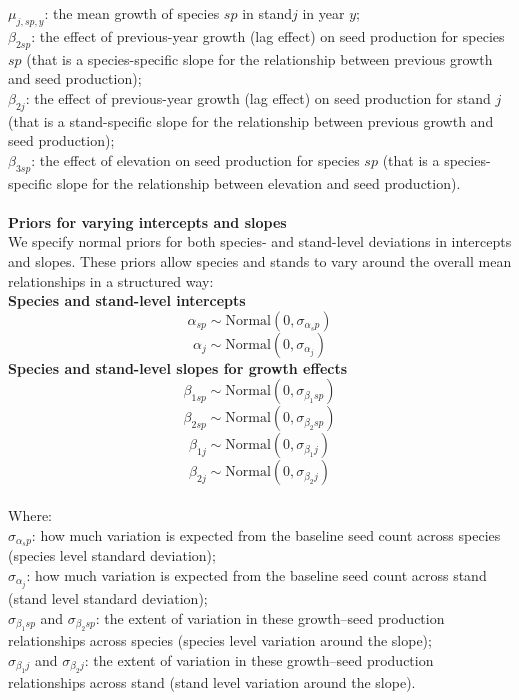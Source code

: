 \documentclass[11pt,letter]{article}
\begin{document}
\(\mu_{j,sp,y}\): the mean growth of species \(sp\) in stand\(j\) in year \(y\);\\
\(\beta_{2 sp}\): the effect of previous-year growth (lag effect) on seed production for species \(sp\) (that is a species-specific slope for the relationship between previous growth and seed production);\\
\(\beta_{2 j}\): the effect of previous-year growth (lag effect) on seed production for stand \(j\) (that is a stand-specific slope for the relationship between previous growth and seed production);\\
\(\beta_{3 sp}\): the effect of elevation on seed production for species \(sp\) (that is a species-specific slope for the relationship between elevation and seed production).\\
\\
\textbf{Priors for varying intercepts and slopes}\\
We specify normal priors for both species- and stand-level deviations in intercepts and slopes. These priors allow species and stands to vary around the overall mean relationships in a structured way:\\
\textbf{Species and stand-level intercepts}
\[
\alpha_{sp} \sim \text{Normal}(0, \sigma_{\alpha_sp})
\]
\[
\alpha_{j} \sim \text{Normal}(0, \sigma_{\alpha_j})
\]
\textbf{Species and stand-level slopes for growth effects}
\[
\beta_{1 sp} \sim \text{Normal}(0, \sigma_{\beta_1 sp})
\]
\[
\beta_{2 sp} \sim \text{Normal}(0, \sigma_{\beta_2 sp})
\]
\[
\beta_{1 j} \sim \text{Normal}(0, \sigma_{\beta_1 j})
\]
\[
\beta_{2 j} \sim \text{Normal}(0, \sigma_{\beta_2 j})
\]
\\
Where:\\ 
\(\sigma_{\alpha_sp}\): how much variation is expected from the baseline seed count across species (species level standard deviation);\\
\(\sigma_{\alpha_j}\): how much variation is expected from the baseline seed count across stand (stand level standard deviation);\\
\(\sigma_{\beta_1 sp}\) and \(\sigma_{\beta_2 sp}\): the extent of variation in these growth–seed production relationships across species (species level variation around the slope);\\
\(\sigma_{\beta_1 j}\) and \(\sigma_{\beta_2 j}\): the extent of variation in these growth–seed production relationships across stand (stand level variation around the slope).
\end{document}
